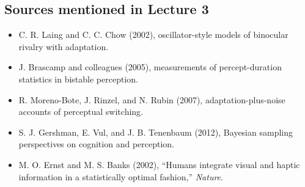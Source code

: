 \subsection*{Sources mentioned in Lecture 3}

\begin{itemize}
    \item C. R. Laing and C. C. Chow (2002), oscillator-style models of binocular rivalry with adaptation.
    \item J. Brascamp and colleagues (2005), measurements of percept-duration statistics in bistable perception.
    \item R. Moreno-Bote, J. Rinzel, and N. Rubin (2007), adaptation-plus-noise accounts of perceptual switching.
    \item S. J. Gershman, E. Vul, and J. B. Tenenbaum (2012), Bayesian sampling perspectives on cognition and perception.
    \item M. O. Ernst and M. S. Banks (2002), ``Humans integrate visual and haptic information in a statistically optimal fashion,'' \emph{Nature}.
\end{itemize}
